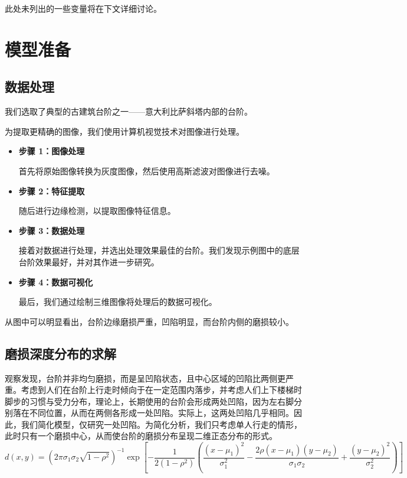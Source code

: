 \documentclass[11pt,a4paper]{ctexart}
\begin{document}
\noindent*此处未列出的一些变量将在下文详细讨论。

\section{模型准备}

\subsection{数据处理}

我们选取了典型的古建筑台阶之一——意大利比萨斜塔内部的台阶。

为提取更精确的图像，我们使用计算机视觉技术对图像进行处理。

\begin{itemize}[leftmargin=2em,itemsep=2pt,topsep=2pt]
\item \textbf{步骤 1：图像处理}

首先将原始图像转换为灰度图像，然后使用高斯滤波对图像进行去噪。
\end{itemize}

\begin{itemize}[leftmargin=2em,itemsep=2pt,topsep=2pt]
\item \textbf{步骤 2：特征提取}

随后进行边缘检测，以提取图像特征信息。

\item \textbf{步骤 3：数据处理}

接着对数据进行处理，并选出处理效果最佳的台阶。我们发现示例图中的底层台阶效果最好，并对其作进一步研究。

\item \textbf{步骤 4：数据可视化}

最后，我们通过绘制三维图像将处理后的数据可视化。
\end{itemize}

从图中可以明显看出，台阶边缘磨损严重，凹陷明显，而台阶内侧的磨损较小。

\subsection{磨损深度分布的求解}

观察发现，台阶并非均匀磨损，而是呈凹陷状态，且中心区域的凹陷比两侧更严重。考虑到人们在台阶上行走时倾向于在一定范围内落步，并考虑人们上下楼梯时脚步的习惯与受力分布，理论上，长期使用的台阶会形成两处凹陷，因为左右脚分别落在不同位置，从而在两侧各形成一处凹陷。实际上，这两处凹陷几乎相同。因此，我们简化模型，仅研究一处凹陷。为简化分析，我们只考虑单人行走的情形，此时只有一个磨损中心，从而使台阶的磨损分布呈现二维正态分布的形式。
\begin{equation}
d(x,y)=\left(2\pi\sigma_1\sigma_2\sqrt{1-\rho^2}\right)^{-1}\exp\left[-\frac{1}{2(1-\rho^2)}\left(\frac{(x-\mu_1)^2}{\sigma_1^2}-\frac{2\rho(x-\mu_1)(y-\mu_2)}{\sigma_1\sigma_2}+\frac{(y-\mu_2)^2}{\sigma_2^2}\right)\right]\tag{1}
\end{equation}
\end{document}
